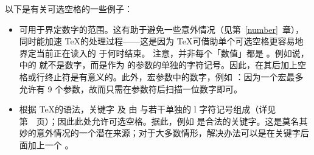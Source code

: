 \documentclass{book}
\begin{document}
以下是有关可选空格的一些例子：

\begin{itemize}
\item {} 可用于界定数字的范围。这有助于避免一些意外情况（见第~\ref{number}~章），同时能加速 \TeX 的处理过程——这是因为 \TeX 可借助单个可选空格更容易地界定当前正在读入的  于何时结束。
注意，并非每个「数值」都是 。例如说， 中的 {} 就不是数字，而是作为  的参数的单独的字符记号。因此，在其后加上空格或行终止符是有意义的。此外，宏参数中的数字，例如 ：因为一个宏最多允许有 9 个参数，故而只需在参数符后扫描一位数字即可。

\item 根据 \TeX 的语法，关键字  及  由  与若干单独的 {\ttfamily l} 字符记号组成（详见第~\pageref{keywords}~页）；因此此处允许可选空格。据此，例如 \hbox{} 是合法的关键字。这是莫名其妙的意外情况的一个潜在来源；对于大多数情形，解决办法可以是在关键字后面加上一个 。


\end{itemize}
\end{document}
